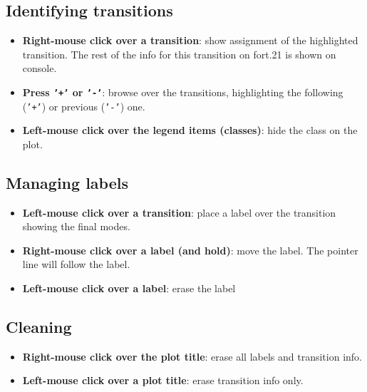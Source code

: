 \documentclass[a4paper,11pt]{article}
\begin{document}
\subsection{Identifying transitions}
\begin{itemize}
 \item \textbf{Right-mouse click over a transition}: show assignment of the highlighted transition. The rest of the info for this transition on fort.21 is shown on console.
 \item \textbf{Press \texttt{'+'} or \texttt{'-'}}: browse over the transitions, highlighting the following (\texttt{'+'}) or previous (\texttt{'-'}) one.
  \item \textbf{Left-mouse click over the legend items (classes)}: hide the class on the plot.
\end{itemize}

\subsection{Managing labels}
\begin{itemize}
 \item \textbf{Left-mouse click over a transition}: place a label over the transition showing the final modes.
 \item \textbf{Right-mouse click over a label (and hold)}: move the label. The pointer line will follow the label.
 \item \textbf{Left-mouse click over a label}: erase the label
\end{itemize}

\subsection{Cleaning}
\begin{itemize}
 \item \textbf{Right-mouse click over the plot title}: erase all labels and transition info.
 \item \textbf{Left-mouse click over a plot title}: erase transition info only.
\end{itemize}
\end{document}

